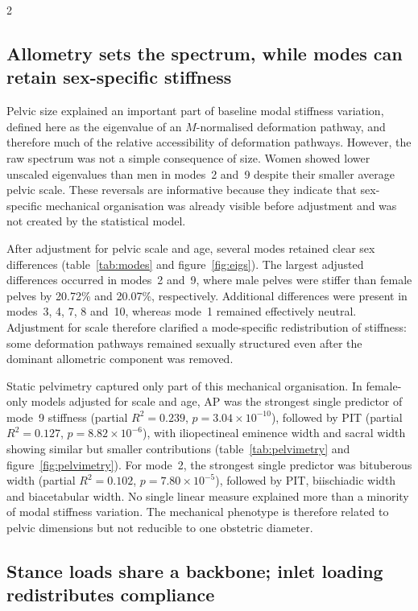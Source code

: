 \documentclass[openacc]{rsproca_new}
\begin{document}
\begin{multicols}{2}
\subsection{Allometry sets the spectrum, while modes can retain sex-specific stiffness}

Pelvic size explained an important part of baseline modal stiffness variation, defined here as the eigenvalue of an $M$-normalised deformation pathway, and therefore much of the relative accessibility of deformation pathways. However, the raw spectrum was not a simple consequence of size. Women showed lower unscaled eigenvalues than men in modes~2 and~9 despite their smaller average pelvic scale. These reversals are informative because they indicate that sex-specific mechanical organisation was already visible before adjustment and was not created by the statistical model.

After adjustment for pelvic scale and age, several modes retained clear sex differences (table~\ref{tab:modes} and figure~\ref{fig:eigs}). The largest adjusted differences occurred in modes~2 and~9, where male pelves were stiffer than female pelves by 20.72\% and 20.07\%, respectively. Additional differences were present in modes~3, 4, 7, 8 and~10, whereas mode~1 remained effectively neutral. Adjustment for scale therefore clarified a mode-specific redistribution of stiffness: some deformation pathways remained sexually structured even after the dominant allometric component was removed.

Static pelvimetry captured only part of this mechanical organisation. In female-only models adjusted for scale and age, AP was the strongest single predictor of mode~9 stiffness (partial $R^2=0.239$, $p=3.04 \times 10^{-10}$), followed by PIT (partial $R^2=0.127$, $p=8.82 \times 10^{-6}$), with iliopectineal eminence width and sacral width showing similar but smaller contributions (table~\ref{tab:pelvimetry} and figure~\ref{fig:pelvimetry}). For mode~2, the strongest single predictor was bituberous width (partial $R^2=0.102$, $p=7.80 \times 10^{-5}$), followed by PIT, biischiadic width and biacetabular width. No single linear measure explained more than a minority of modal stiffness variation. The mechanical phenotype is therefore related to pelvic dimensions but not reducible to one obstetric diameter.

\subsection{Stance loads share a backbone; inlet loading redistributes compliance}


\end{multicols}
\end{document}
